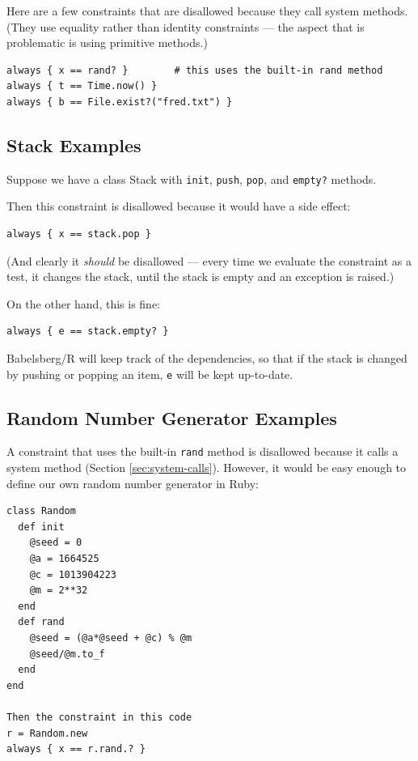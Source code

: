 \documentclass{article}
\begin{document}
Here are a few constraints that are disallowed because they call
system methods.  (They use equality rather than identity constraints
--- the aspect that is problematic is using primitive methods.)

\begin{verbatim} 
always { x == rand? }        # this uses the built-in rand method 
always { t == Time.now() }
always { b == File.exist?("fred.txt") }
\end{verbatim} 

\subsection{Stack Examples}

Suppose we have a class Stack with \verb|init|, \verb|push|,
\verb|pop|, and \verb|empty?| methods.

Then this constraint is disallowed because it would have a side
effect:

\begin{verbatim}
always { x == stack.pop }
\end{verbatim}

(And clearly it \emph{should} be disallowed --- every time we evaluate
the constraint as a test, it changes the stack, until the stack is
empty and an exception is raised.)

On the other hand, this is fine:
\begin{verbatim}
always { e == stack.empty? }
\end{verbatim}

Babelsberg/R will keep track of the dependencies, so that if the stack
is changed by pushing or popping an item, \verb|e| will be kept
up-to-date.

\subsection{Random Number Generator Examples}

A constraint that uses the built-in \verb|rand| method is disallowed
because it calls a system method (Section \ref{sec:system-calls}).
However, it would be easy enough to define our own random number
generator in Ruby:

\begin{verbatim}
class Random
  def init
    @seed = 0
    @a = 1664525
    @c = 1013904223
    @m = 2**32
  end
  def rand
    @seed = (@a*@seed + @c) % @m
    @seed/@m.to_f
  end
end

Then the constraint in this code
r = Random.new
always { x == r.rand.? }
\end{verbatim}
\end{document}
